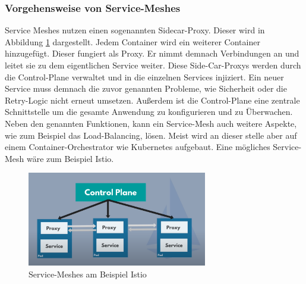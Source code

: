 \subsubsection{Vorgehensweise von Service-Meshes}
Service Meshes nutzen einen sogenannten Sidecar-Proxy. Dieser wird in Abbildung \ref{fig:service-mesh} dargestellt. Jedem Container wird ein weiterer Container hinzugefügt. Dieser fungiert als Proxy. Er nimmt demnach Verbindungen an und leitet sie zu dem eigentlichen Service weiter. Diese Side-Car-Proxys werden durch die Control-Plane verwaltet und in die einzelnen Services injiziert. Ein neuer Service muss demnach die zuvor genannten Probleme, wie Sicherheit oder die Retry-Logic nicht erneut umsetzen. Außerdem ist die Control-Plane eine zentrale Schnittstelle um die gesamte Anwendung zu konfigurieren und zu Überwachen. Neben den genannten Funktionen, kann ein Service-Mesh auch weitere Aspekte, wie zum Beispiel das Load-Balancing, lösen. Meist wird an dieser stelle aber auf einem Container-Orchestrator wie Kubernetes aufgebaut. Eine mögliches Service-Mesh wäre zum Beispiel Istio. 
\begin{figure}[bth] 
  \centering
  \includegraphics[width=0.7\textwidth]{Chapters/2-Grundlagen/Graphics/service-meshes.png}
  \caption{Service-Meshes am Beispiel Istio \cite{codingwithnana_istio_nodate}}
  \label{fig:service-mesh}
\end{figure}